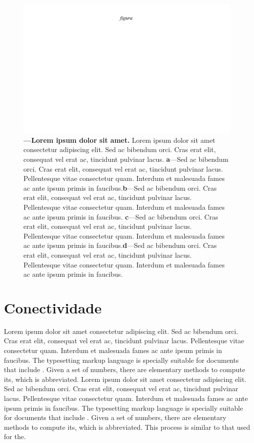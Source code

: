 \documentclass[./main.tex]{subfiles}
\begin{document}
\begin{figure}[t!] 
\centering				
\includegraphics[width=0.95\linewidth]{figs/fig_m.jpg}		
\caption[Lorem ipsum dolor sit amet]
{\textbf{---\;Lorem ipsum dolor sit amet.}
    Lorem ipsum dolor sit amet consectetur adipiscing elit. Sed ac bibendum orci. Cras erat elit, consequat vel erat ac, tincidunt pulvinar lacus. \;\textbf{a}\;---\;Sed ac bibendum orci. Cras erat elit, consequat vel erat ac, tincidunt pulvinar lacus. Pellentesque vitae consectetur quam. Interdum et malesuada fames ac ante ipsum primis in faucibus.\;\textbf{b}\;---\;Sed ac bibendum orci. Cras erat elit, consequat vel erat ac, tincidunt pulvinar lacus. Pellentesque vitae consectetur quam. Interdum et malesuada fames ac ante ipsum primis in faucibus. \;\textbf{c}\;---\;Sed ac bibendum orci. Cras erat elit, consequat vel erat ac, tincidunt pulvinar lacus. Pellentesque vitae consectetur quam. Interdum et malesuada fames ac ante ipsum primis in faucibus.\;\textbf{d}\;---\;Sed ac bibendum orci. Cras erat elit, consequat vel erat ac, tincidunt pulvinar lacus. Pellentesque vitae consectetur quam. Interdum et malesuada fames ac ante ipsum primis in faucibus.
}
\label{fig:hydro:1} 		
\end{figure}

\section{Conectividade}

\par Lorem ipsum dolor sit amet consectetur adipiscing elit. Sed ac bibendum orci. Cras erat elit, consequat vel erat ac, tincidunt pulvinar lacus. Pellentesque vitae consectetur quam. Interdum et malesuada fames ac ante ipsum primis in faucibus. The typesetting markup language is specially suitable for documents that include . Given a set of numbers, there are elementary methods to compute its, which is abbreviated. Lorem ipsum dolor sit amet consectetur adipiscing elit. Sed ac bibendum orci. Cras erat elit, consequat vel erat ac, tincidunt pulvinar lacus. Pellentesque vitae consectetur quam. Interdum et malesuada fames ac ante ipsum primis in faucibus. The typesetting markup language is specially suitable for documents that include . Given a set of numbers, there are elementary methods to compute its, which is abbreviated. This process is similar to that used for the. 
\end{document}
